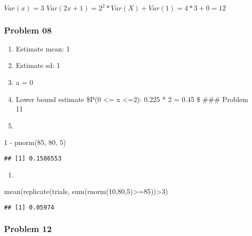 \documentclass[
]{article}
\newenvironment{Shaded}{\begin{snugshade}}{\end{snugshade}}
\newcommand{\DecValTok}[1]{\textcolor[rgb]{0.00,0.00,0.81}{#1}}
\newcommand{\FunctionTok}[1]{\textcolor[rgb]{0.00,0.00,0.00}{#1}}
\newcommand{\NormalTok}[1]{#1}
\newcommand{\SpecialCharTok}[1]{\textcolor[rgb]{0.00,0.00,0.00}{#1}}
\providecommand{\tightlist}{%
  \setlength{\itemsep}{0pt}\setlength{\parskip}{0pt}}
\begin{document}
\(Var(x) = 3\) \(Var(2x+1) = 2^2 * Var(X) + Var(1) = 4 * 3 + 0 = 12\)

\hypertarget{problem-08}{%
\subsubsection{Problem 08}\label{problem-08}}

\begin{enumerate}
\def\labelenumi{\alph{enumi}.}
\tightlist
\item
  Estimate mean: 1
\item
  Estimate sd: 1
\item
  a = 0
\item
  Lower bound estimate \$P(0 \textless= x \textless=2): 0.225 * 2 = 0.45
  \$ \#\#\# Problem 11
\item
\end{enumerate}

\begin{Shaded}
\begin{Highlighting}[]
\DecValTok{1} \SpecialCharTok{{-}} \FunctionTok{pnorm}\NormalTok{(}\DecValTok{85}\NormalTok{, }\DecValTok{80}\NormalTok{, }\DecValTok{5}\NormalTok{)}
\end{Highlighting}
\end{Shaded}

\begin{verbatim}
## [1] 0.1586553
\end{verbatim}

\begin{enumerate}
\def\labelenumi{\alph{enumi}.}
\setcounter{enumi}{1}
\tightlist
\item
\end{enumerate}

\begin{Shaded}
\begin{Highlighting}[]
  \FunctionTok{mean}\NormalTok{(}\FunctionTok{replicate}\NormalTok{(trials, }\FunctionTok{sum}\NormalTok{(}\FunctionTok{rnorm}\NormalTok{(}\DecValTok{10}\NormalTok{,}\DecValTok{80}\NormalTok{,}\DecValTok{5}\NormalTok{)}\SpecialCharTok{\textgreater{}=}\DecValTok{85}\NormalTok{))}\SpecialCharTok{\textgreater{}}\DecValTok{3}\NormalTok{)}
\end{Highlighting}
\end{Shaded}

\begin{verbatim}
## [1] 0.05974
\end{verbatim}

\hypertarget{problem-12}{%
\subsubsection{Problem 12}\label{problem-12}}
\end{document}
